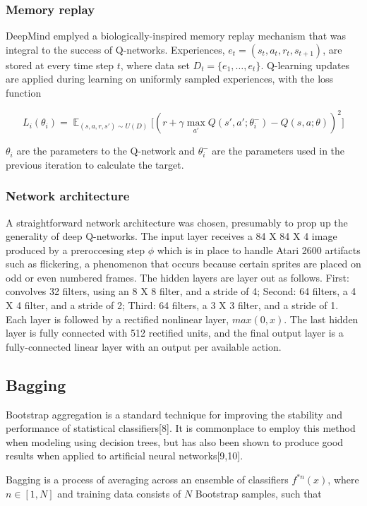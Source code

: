 \documentclass{article} %
\DeclareMathOperator{\E}{\mathbb{E}}
\begin{document}
\subsubsection*{Memory replay}
DeepMind emplyed a biologically-inspired memory replay mechanism that was integral
to the success of Q-networks. Experiences, $e_t = (s_t,a_t,r_t,s_{t+1})$, are stored 
at every time step $t$, where data set $ D_t = \{ e_{1}, \dots, e_{t} \} $. 
Q-learning updates are applied during learning on uniformly sampled experiences, 
with the loss function

\[
L_i(\theta_i) = \E_{(s,a,r,s') \sim U(D)} \bigg[ 
    \left( r + \gamma \max_{a'} Q(s',a';\theta^-_i) - Q(s,a;\theta)\right)^2 
\bigg]
\]

$\theta_i$ are the parameters to the Q-network and $\theta^-_i$ are the parameters used 
in the previous iteration to calculate the target.

\subsubsection*{Network architecture}
A straightforward network architecture was chosen, presumably to prop up the 
generality of deep Q-networks. The input layer receives a 84 X 84 X 4 image produced
by a preroccesing step $\phi$ which is in place to handle Atari 2600 artifacts such as 
flickering, a phenomenon that occurs because certain sprites are placed on odd or even 
numbered frames. The hidden layers are layer out as follows. First: convolves 32 filters, 
using an 8 X 8 filter, and a stride of 4; Second: 64 filters, a 4 X 4 filter, and a stride 
of 2; Third: 64 filters, a 3 X 3 filter, and a stride of 1. Each layer is followed by a 
rectified nonlinear layer, $max(0,x)$. The last hidden layer is fully connected with 512
rectified units, and the final output layer is a fully-connected linear layer with an output
per available action.


\subsection{Bagging}
Bootstrap aggregation is a standard technique for improving the stability
and performance of statistical classifiers[8].
It is commonplace to employ this method when modeling using decision trees, but has 
also been shown to produce good results when applied to artificial neural networks[9,10].

Bagging is a process of averaging across an ensemble of classifiers $f^{*n}(x)$, where $n \in [1,N]$
and training data consists of $N$ Bootstrap samples, such that
\end{document}
